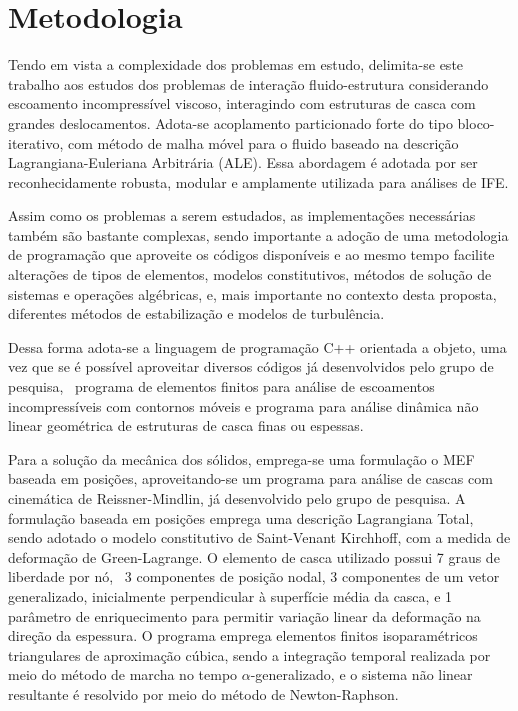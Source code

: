 \section{Metodologia} \label{MetodologiaCronograma}

Tendo em vista a complexidade dos problemas em estudo, delimita-se este trabalho aos estudos dos problemas de interação fluido-estrutura considerando escoamento incompressível viscoso, interagindo com estruturas de casca com grandes deslocamentos. Adota-se acoplamento particionado forte do tipo bloco-iterativo, com método de malha móvel para o fluido baseado na descrição Lagrangiana-Euleriana Arbitrária (ALE). Essa abordagem é adotada por ser reconhecidamente robusta, modular e amplamente utilizada para análises de IFE.

Assim como os problemas a serem estudados, as implementações necessárias também são bastante complexas, sendo importante a adoção de uma metodologia de programação que aproveite os códigos disponíveis e ao mesmo tempo facilite alterações de tipos de elementos, modelos constitutivos, métodos de solução de sistemas e operações algébricas, e, mais importante no contexto desta proposta, diferentes métodos de estabilização e modelos de turbulência.

Dessa forma adota-se a linguagem de programação C++ orientada a objeto, uma vez que se é possível aproveitar diversos códigos já desenvolvidos pelo grupo de pesquisa, \ie\ programa de elementos finitos para análise de escoamentos incompressíveis com contornos móveis e programa para análise dinâmica não linear geométrica de estruturas de casca finas ou espessas.

Para a solução da mecânica dos sólidos, emprega-se uma formulação o MEF baseada em posições, aproveitando-se um programa para análise de cascas com cinemática de Reissner-Mindlin, já desenvolvido pelo grupo de pesquisa. A formulação baseada em posições emprega uma descrição Lagrangiana Total, sendo adotado o modelo constitutivo de Saint-Venant Kirchhoff, com a medida de deformação de Green-Lagrange. O elemento de casca utilizado possui 7 graus de liberdade por nó, \ie\ 3 componentes de posição nodal, 3 componentes de um vetor generalizado, inicialmente perpendicular à superfície média da casca, e 1 parâmetro de enriquecimento para permitir variação linear da deformação na direção da espessura. O programa emprega elementos finitos isoparamétricos triangulares de aproximação cúbica, sendo a integração temporal realizada por meio do método de marcha no tempo $\alpha$-generalizado, e o sistema não linear resultante é resolvido por meio do método de Newton-Raphson.%

